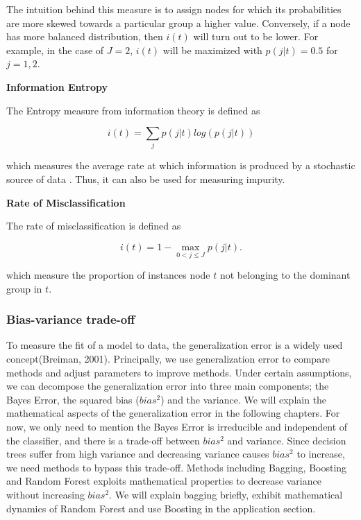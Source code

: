 The intuition behind this measure is to assign nodes for which its probabilities are more skewed towards a particular group a higher value.
Conversely, if a node has more balanced distribution, then \(i(t)\) will turn out to be lower.
For example, in the case of \( J=2 \), \(i(t)\) will be maximized with \( p(j|t) = 0.5 \) for \(j = 1, 2\).


\textbf{Information Entropy}

The Entropy measure from information theory is defined as

\begin{equation}
    i(t) = \sum_{j} p(j|t) log(p(j|t))
\end{equation}

which measures the average rate at which information is produced by a stochastic source of data .
Thus, it can also be used for measuring impurity.

\newpage

\textbf{Rate of Misclassification}

The rate of misclassification is defined as 

\begin{equation}
    i(t) = 1 - \max_{0 < j \leq J} p(j|t) .
\end{equation}

which measure the proportion of instances node \(t\) not belonging to the dominant group in \(t\).


\subsubsection{Bias-variance trade-off}
To measure the fit of a model to data, the generalization error is a widely used concept(Breiman, 2001). Principally, we use generalization error to compare methods and adjust parameters to improve methods. Under certain assumptions, we can decompose the generalization error into three main components; the Bayes Error, the squared bias ($bias^2$) and the variance. We will explain the mathematical aspects of the generalization error in the following chapters. For now, we only need to mention the Bayes Error is irreducible and independent of the classifier, and there is a trade-off between $bias^2$ and variance. Since decision trees suffer from high variance and decreasing variance causes $bias^2$ to increase, we need methods to bypass this trade-off. Methods including Bagging, Boosting and Random Forest exploits mathematical properties to decrease variance without increasing $bias^2$. We will explain bagging briefly, exhibit mathematical dynamics of Random Forest and use Boosting in the application section.


